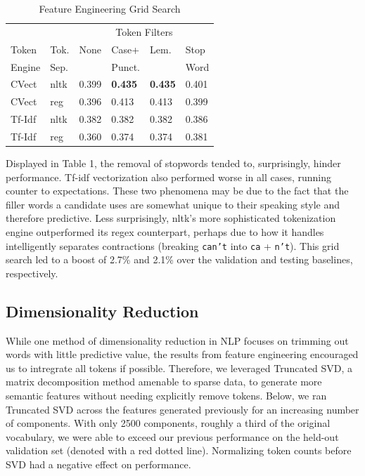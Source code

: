 \documentclass[11pt,a4paper]{article}
\begin{document}
\FloatBarrier
\begin{table}[h]
    \centering
    \caption{Feature Engineering Grid Search}
    \begin{tabular}{
    	l
        l
        l
        l
        l
        l
        }
        \toprule
        \multicolumn{2}{c}{} &
        \multicolumn{4}{c}{Token Filters}\\
        \cmidrule(lr){3-6} 
        {Token}& {Tok.} &{None} &{Case+}&{Lem.}& {Stop}\\
        {Engine} & {Sep.} && {Punct.}&&{Word}\\
        \midrule
      CVect & nltk & 0.399& \textbf{0.435}& \textbf{0.435}& 0.401\\
        CVect & reg& 0.396& 0.413&0.413& 0.399\\
        Tf-Idf & nltk & 0.382&  0.382 &0.382 & 0.386\\
        Tf-Idf & reg & 0.360& 0.374 & 0.374& 0.381\\
        \bottomrule
    \end{tabular}
\end{table}
\FloatBarrier

Displayed in Table 1, the removal of stopwords tended to, surprisingly, hinder performance. Tf-idf vectorization also performed worse in all cases, running counter to expectations. These two phenomena may be due to the fact that the filler words a candidate uses are somewhat unique to their speaking style and therefore predictive. Less surprisingly, nltk's more sophisticated tokenization engine outperformed its regex counterpart, perhaps due to how it handles intelligently separates contractions (breaking \texttt{can't} into \texttt{ca} + \texttt{n't}). This grid search led to a boost of 2.7\% and 2.1\% over the validation and testing baselines, respectively. 

\subsection{Dimensionality Reduction}%
\label{sub:dimensionality_reduction}

While one method of dimensionality reduction in NLP focuses on trimming out words with little predictive value, the results from feature engineering encouraged us to intregrate all tokens if possible. Therefore, we leveraged Truncated SVD, a matrix decomposition method amenable to sparse data, to generate more semantic features without needing explicitly remove tokens. Below, we ran Truncated SVD across the features generated previously for an increasing number of components. With only 2500 components, roughly a third of the original vocabulary, we were able to exceed our previous performance on the held-out validation set (denoted with a red dotted line). Normalizing token counts before SVD had a negative effect on performance. 
\end{document}
